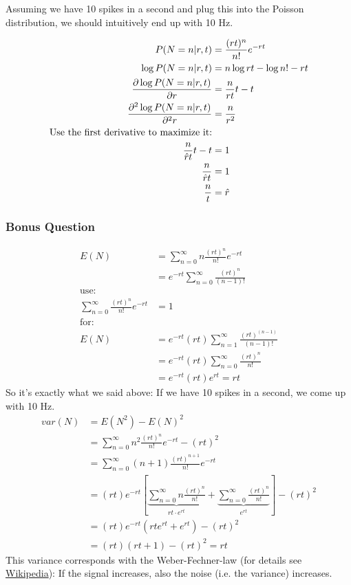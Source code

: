 \documentclass[../main/Notes.tex]{subfiles}
\begin{document}
Assuming we have 10 spikes in a second and plug this into the Poisson distribution, we should intuitively end up with 10 Hz.

\begin{align*}\index{Maximum likelihood}
P(N=n|r,t) &= \frac{(rt)^n}{n!} e^{-rt} \\
\log{P(N=n|r,t)} &= n \log{rt} - \log{n!} - rt \\
\frac{\partial\log{P(N=n|r,t)}}{\partial r} &= \frac{n}{rt}t-t \\
\frac{\partial^2\log{P(N=n|r,t)}}{\partial^2 r} &= \frac{n}{r^2} \\
\text{Use the first derivative to maximize it:}\\
\frac{n}{\est{r}t}t-t &= 1 \\
\frac{n}{\est{r}t} &= 1 \\
\frac{n}{t} &= \est{r}
\end{align*}

\subsubsection*{Bonus Question}
\begin{align*}
E(N) &= \sum_{n=0}^\infty{n \frac{(rt)^n}{n!} e^{-rt}} \\
     &= e^{-rt} \sum_{n=0}^\infty{\frac{(rt)^n}{(n-1)!}} \\
\text{use:}&\\
\sum_{n=0}^\infty{\frac{(rt)^n}{n!} e^{-rt}} &= 1 \\
\text{for:}&\\
E(N) &= e^{-rt} (rt) \sum_{n=1}^\infty{\frac{(rt)^{(n-1)}}{(n-1)!}} \\
     &= e^{-rt} (rt) \sum_{n=0}^\infty{\frac{(rt)^{n}}{n!}} \\
     &= e^{-rt} (rt) e^{rt} = rt
\end{align*}
So it's exactly what we said above: If we have 10 spikes in a second, we come up with 10 Hz.
\begin{align*}
var(N) &= E(N^2)-E(N)^2 \\
       &= \sum_{n=0}^\infty{n^2 \frac{(rt)^n}{n!} e^{-rt}} - (rt)^2 \\
       &= \sum_{n=0}^\infty{(n+1) \frac{(rt)^{n+1}}{n!} e^{-rt}} \\
       &= (rt)e^{-rt}\left[ \underbrace{ \sum_{n=0}^\infty{n \frac{(rt)^n}{n!}} }_{rt\cdot e^{rt}} +  \underbrace{ \sum_{n=0}^\infty{\frac{(rt)^n}{n!}} }_{e^{rt}} \right] - (rt)^2 \\
       &= (rt)e^{-rt}\left(rt e^{rt}+e^{rt}\right) - (rt)^2 \\
       &= (rt)(rt+1)-(rt)^2 = rt
\end{align*}
This variance corresponds with the Weber-Fechner-law (for details see \href{http://en.wikipedia.org/wiki/Weber-Fechner_law}{Wikipedia}): If the signal increases, also the noise (i.e. the variance) increases.
\end{document}
